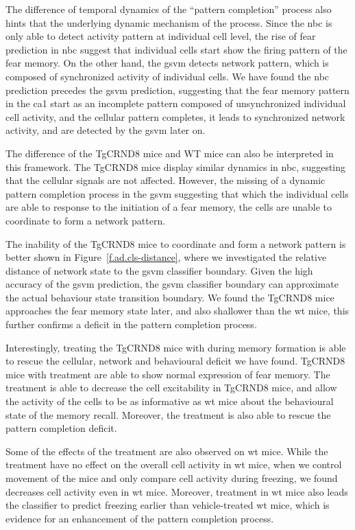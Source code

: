 The difference of temporal dynamics of the ``pattern completion'' process also hints that the underlying dynamic mechanism of the process. Since the \gls{nbc} is only able to detect activity pattern at individual cell level, the rise of fear prediction in \gls{nbc} suggest that individual cells start show the firing pattern of the fear memory. On the other hand, the \gls{gsvm} detects network pattern, which is composed of synchronized activity of individual cells. We have found the \gls{nbc} prediction precedes the \gls{gsvm} prediction, suggesting that the fear memory pattern in the \gls{ca1} start as an incomplete pattern composed of unsynchronized individual cell activity, and the cellular pattern completes, it leads to synchronized network activity, and are detected by the \gls{gsvm} later on. 

The difference of the TgCRND8 mice and WT mice can also be interpreted in this framework. The TgCRND8 mice display similar dynamics in \gls{nbc}, suggesting that the cellular signals are not affected. However, the missing of a dynamic pattern completion process in the \gls{gsvm} suggesting that which the individual cells are able to response to the initiation of a fear memory, the cells are unable to coordinate to form a network pattern. 

The inability of the TgCRND8 mice to coordinate and form a network pattern is better shown in Figure~\ref{f.ad.cls-distance}, where we investigated the relative distance of network state to the \gls{gsvm} classifier boundary. Given the high accuracy of the \gls{gsvm} prediction, the \gls{gsvm} classifier boundary can approximate the actual behaviour state transition boundary. We found the TgCRND8 mice approaches the fear memory state later, and also shallower than the \gls{wt} mice, this further confirms a deficit in the pattern completion process. 

Interestingly, treating the TgCRND8 mice with \tglu{} during memory formation is able to rescue the cellular, network and behavioural deficit we have found. TgCRND8 mice with \tglu{} treatment are able to show normal expression of fear memory. The \tglu{} treatment is able to decrease the cell excitability in TgCRND8 mice, and allow the activity of the cells to be as informative as \gls{wt} mice about the behavioural state of the memory recall. Moreover, the \tglu{} treatment is also able to rescue the pattern completion deficit. 

Some of the effects of the \tglu{} treatment are also observed on \gls{wt} mice. While the \tglu{} treatment have no effect on the overall cell activity in \gls{wt} mice, when we control movement of the mice and only compare cell activity during freezing, we found \tglu{} decreases cell activity even in \gls{wt} mice. Moreover, \tglu{} treatment in \gls{wt} mice also leads the classifier to predict freezing earlier than vehicle-treated \gls{wt} mice, which is evidence for an enhancement of the pattern completion process. 


